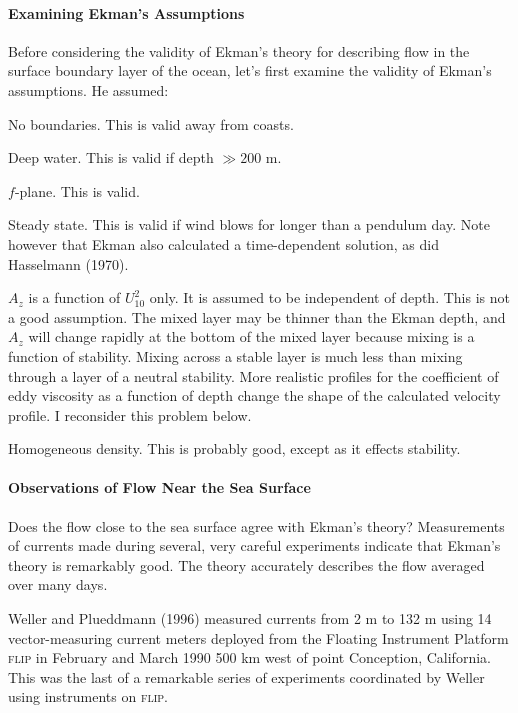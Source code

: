 \paragraph{Examining Ekman's Assumptions}
Before considering the
validity of Ekman's theory for describing flow in the surface boundary
layer of the ocean, let's first examine the validity of Ekman's
assumptions. He assumed:
\begin{enumerate}
\vitem No boundaries. This is valid away from coasts.
  
\vitem Deep water. This is valid if depth $\gg 200$ m.

\vitem $f$-plane. This is valid.

\vitem Steady state. This is valid if wind blows for longer than a
pendulum day.  Note however that Ekman also calculated a
time-dependent solution, as did Hasselmann (1970).

\vitem $A_z$ is a function of $U^2_{10}$ only. It is assumed to be
independent of depth. This is not a good assumption. The mixed
layer may be thinner than the Ekman
depth, and $A_z$ will change rapidly at the bottom of the mixed
layer because mixing is a function
of stability. Mixing across a stable layer is much less than mixing
through a layer of a neutral stability. More realistic profiles for
the coefficient of eddy viscosity as a function of depth change the
shape of the calculated velocity profile. I reconsider this problem
below.

\vitem Homogeneous density. This is probably good, except as it
effects stability.
\end{enumerate}

\paragraph{Observations of Flow Near the Sea Surface}
Does the flow close to the sea
surface agree with Ekman's theory? Measurements of currents made
during several, very careful experiments indicate that Ekman's theory
is remarkably good. The theory accurately describes the flow averaged
over many days.

Weller and Plueddmann (1996) measured currents from 2 m to 132 m using
14 vector-measuring current meters deployed from the Floating
Instrument Platform \textsc{flip} in February and March 1990 500 km
west of point Conception, California.  This was the last of a
remarkable series of experiments coordinated by Weller using
instruments on \textsc{flip}.

